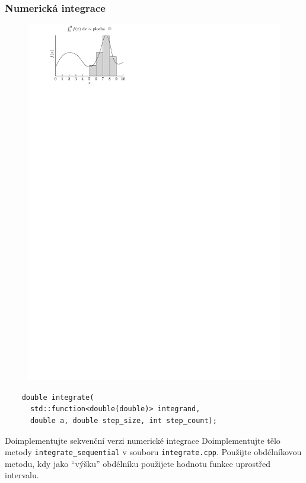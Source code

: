 \documentclass[usenames,dvipsnames,9pt]{beamer}
\begin{document}
{
\begin{frame}[fragile]
  \frametitle{Numerická integrace}
  
  \begin{figure}
    \centering\includegraphics{figs/integral.pdf}
  \end{figure}

  \begin{verbatim}
    double integrate(
      std::function<double(double)> integrand,
      double a, double step_size, int step_count);
  \end{verbatim}
\end{frame}

\begin{frame}[fragile]
  \begin{block}{Doimplementujte sekvenční verzi numerické integrace}
    Doimplementujte tělo metody \texttt{integrate\_sequential} v souboru \texttt{integrate.cpp}.
    Použijte obdélníkovou metodu, kdy jako ``výšku'' obdélníku použijete hodnotu funkce uprostřed intervalu.


\end{block}
\end{frame}}
\end{document}
